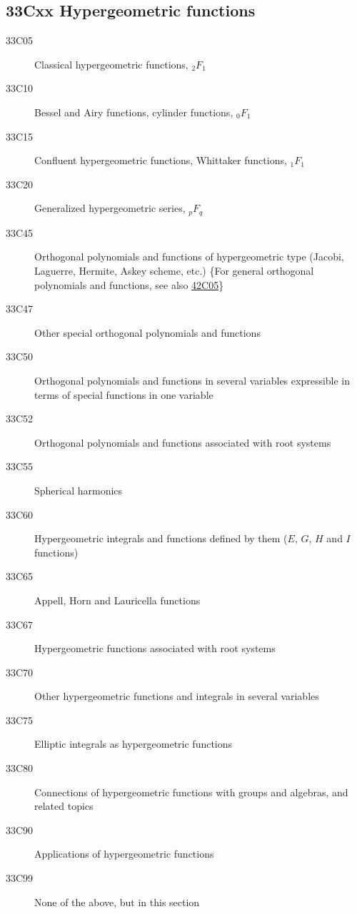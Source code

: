 \subsection*{33Cxx  Hypergeometric functions }\label{33Cxx}
\begin{description}  
\item [33C05]\label{33C05} Classical hypergeometric functions, ${}_2F_1$
\item [33C10]\label{33C10} Bessel and Airy functions, cylinder functions, ${}_0F_1$
\item [33C15]\label{33C15} Confluent hypergeometric functions, Whittaker functions, ${}_1F_1$
\item [33C20]\label{33C20} Generalized hypergeometric series, ${}_pF_q$
\item [33C45]\label{33C45} Orthogonal polynomials and functions of hypergeometric type (Jacobi, Laguerre, Hermite, Askey scheme, etc.) \{For general orthogonal polynomials and functions, see also \hyperref[42C05]{42C05}\}
\item [33C47]\label{33C47} Other special orthogonal polynomials and functions
\item [33C50]\label{33C50} Orthogonal polynomials and functions in several variables expressible in terms of special functions in one variable
\item [33C52]\label{33C52} Orthogonal polynomials and functions associated with root systems
\item [33C55]\label{33C55} Spherical harmonics 
\item [33C60]\label{33C60} Hypergeometric integrals and functions defined by them ($E$, $G$, $H$ and $I$ functions)
\item [33C65]\label{33C65} Appell, Horn and Lauricella functions
\item [33C67]\label{33C67} Hypergeometric functions associated with root systems
\item [33C70]\label{33C70} Other hypergeometric functions and integrals in several variables
\item [33C75]\label{33C75} Elliptic integrals as hypergeometric functions
\item [33C80]\label{33C80}  Connections of hypergeometric functions with groups and algebras, and related topics
\item [33C90]\label{33C90} Applications of hypergeometric functions
\item [33C99]\label{33C99} None of the above, but in this section
\end{description}
